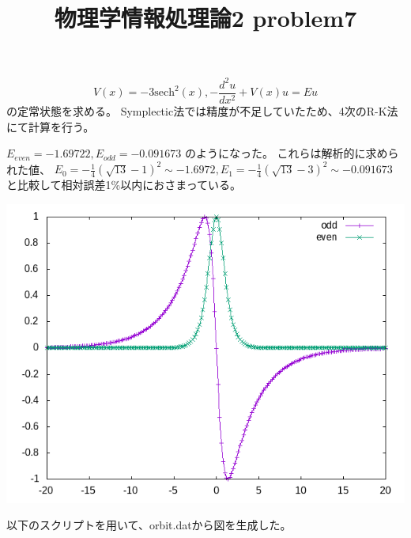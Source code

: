 \documentclass[12pt,a5]{bxjsarticle}
\title{物理学情報処理論2 problem7}
\date{}
\begin{document}
\maketitle

\section{}

\[
  V(x) = -3\mathrm{sech}^2(x), -\frac{d^2u}{dx^2} + V(x) u = E u
\]
の定常状態を求める。
Symplectic法では精度が不足していたため、4次のR-K法にて計算を行う。

$ E_{even} = -1.69722, E_{odd} = -0.091673 $ のようになった。
これらは解析的に求められた値、
$ E_0 = - \frac{1}{4}(\sqrt{13}-1)^2 \sim -1.6972, E_1 = - \frac{1}{4}(\sqrt{13}-3)^2 \sim -0.091673 $ と比較して相対誤差1\%以内におさまっている。

\includegraphics[width=\linewidth]{graph.png}

以下のスクリプトを用いて、orbit.datから図を生成した。

\end{document}
